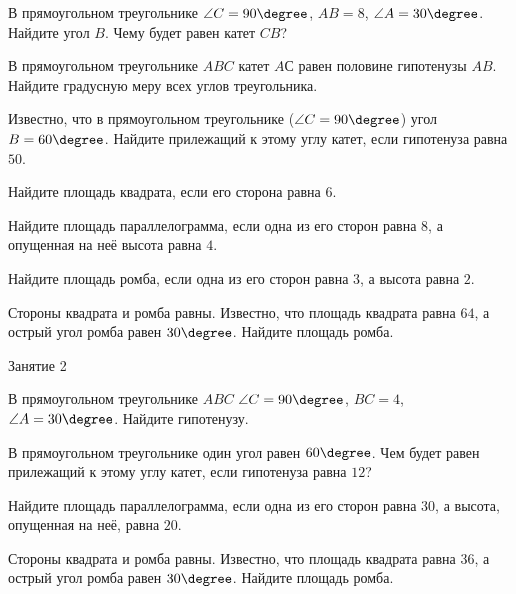 %
%

\begin{class}[number=1]
	\begin{listofex}
		\item В прямоугольном треугольнике \( \angle C=90\degree \), \( AB=8 \), \( \angle A=30\degree \). Найдите угол \( B \). Чему будет равен катет \( CB \)?
		\item В прямоугольном треугольнике \( ABC \) катет \( AС \) равен половине гипотенузы \( AB \). Найдите градусную меру всех углов треугольника.
		\item Известно, что в прямоугольном треугольнике (\( \angle C=90\degree \)) угол \( B=60\degree \). Найдите прилежащий к этому углу катет, если гипотенуза равна \( 50 \).
		\item Найдите площадь квадрата, если его сторона равна \( 6 \).
		\item Найдите площадь параллелограмма, если одна из его сторон равна \( 8 \), а опущенная на неё высота равна \( 4 \).
		\item Найдите площадь ромба, если одна из его сторон равна \( 3 \), а высота равна \( 2 \).
		\item Стороны квадрата и ромба равны. Известно, что площадь квадрата равна \( 64 \), а острый угол ромба равен \( 30\degree \). Найдите площадь ромба.
	\end{listofex}
\end{class}

\begin{class}[number=2]
	\begin{listofex}
		\item Занятие 2
	\end{listofex}
\end{class}

\begin{homework}[number=1]
	\begin{listofex}
		\item В прямоугольном треугольнике \( ABC \) \( \angle C=90\degree \), \( BC=4 \), \( \angle A=30\degree \). Найдите гипотенузу.
		\item В прямоугольном треугольнике один угол равен \( 60\degree \). Чем будет равен прилежащий к этому углу катет, если гипотенуза равна \( 12 \)?
		\item Найдите площадь параллелограмма, если одна из его сторон равна \( 30 \), а высота, опущенная на неё, равна \( 20 \).
		\item Стороны квадрата и ромба равны. Известно, что площадь квадрата равна \( 36 \), а острый угол ромба равен \( 30\degree \). Найдите площадь ромба.
	\end{listofex}
\end{homework}

